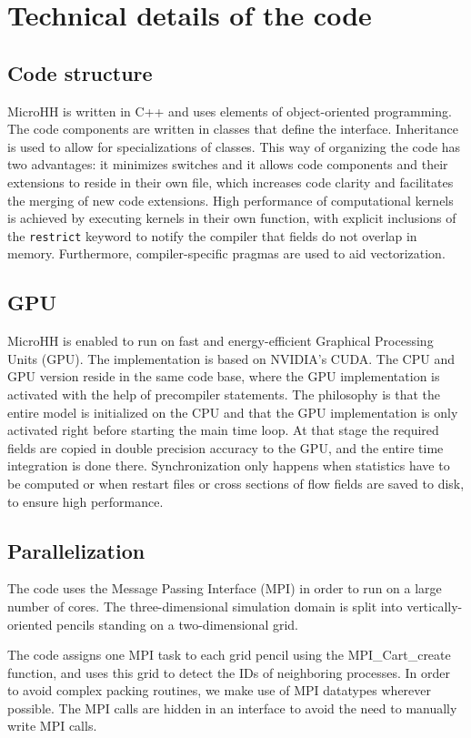 \documentclass[gmd]{copernicus}
\begin{document}
\section{Technical details of the code}\label{sec:technical}
\subsection{Code structure}
MicroHH is written in C++ and uses elements of object-oriented programming. The code components are written in classes that define the interface. Inheritance is used to allow for specializations of classes. This way of organizing the code has two advantages: it minimizes switches and it allows code components and their extensions to reside in their own file, which increases code clarity and facilitates the merging of new code extensions. High performance of computational kernels is achieved by executing kernels in their own function, with explicit inclusions of the \texttt{restrict} keyword to notify the compiler that fields do not overlap in memory. Furthermore, compiler-specific pragmas are used to aid vectorization.

\subsection{GPU}
MicroHH is enabled to run on fast and energy-efficient Graphical Processing Units (GPU). The implementation is based on NVIDIA's CUDA. The CPU and GPU version reside in the same code base, where the GPU implementation is activated with the help of precompiler statements. The philosophy is that the entire model is initialized on the CPU and that the GPU implementation is only activated right before starting the main time loop. At that stage the required fields are copied in double precision accuracy to the GPU, and the entire time integration is done there. Synchronization only happens when statistics have to be computed or when restart files or cross sections of flow fields are saved to disk, to ensure high performance.

\subsection{Parallelization}
The code uses the Message Passing Interface (MPI) in order to run on a large number of cores. The three-dimensional simulation domain is split into vertically-oriented pencils standing on a two-dimensional grid.

The code assigns one MPI task to each grid pencil using the MPI\_Cart\_create function, and uses this grid to detect the IDs of neighboring processes. In order to avoid complex packing routines, we make use of MPI datatypes wherever possible. The MPI calls are hidden in an interface to avoid the need to manually write MPI calls.
\end{document}
